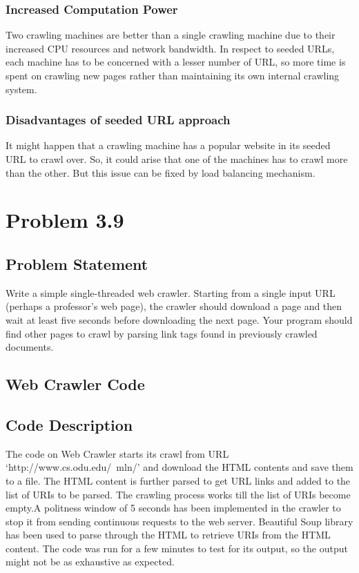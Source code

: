\documentclass[12pt]{report}
\begin{document}
\subsection{Increased Computation Power}
Two crawling machines are better than a single crawling machine due to their increased CPU resources and network bandwidth. In respect to seeded URLs, each machine has to be concerned with a lesser number of URL, so more time is spent on crawling new pages rather than maintaining its own internal crawling system.
\subsection{Disadvantages of seeded URL approach}
It might happen that a crawling machine has a popular website in its seeded URL to crawl over. So, it could arise that one of the machines has to crawl more than the other. But this issue can be fixed by load balancing mechanism. 
\chapter{Problem 3.9}
\section{Problem Statement}
Write a simple single-threaded web crawler. Starting from a single input URL (perhaps a professor’s web page), the crawler should download a page and then wait at least five seconds before downloading the next page. Your program should find other pages to crawl by parsing link tags found in previously crawled documents.
\section{Web Crawler Code}

\section{Code Description}
The code on Web Crawler starts its crawl from URL `http://www.cs.odu.edu/~mln/' and download the HTML contents and save them to a file. The HTML content is further parsed to get URL links and added to the list of URIs to be parsed. The crawling process works till the list of URIs become empty.A politness window of 5 seconds has been implemented in the crawler to stop it from sending continuous requests to the web server. Beautiful Soup library has been used to parse through the HTML to retrieve URIs from the HTML content.  \cite{11} The code was run for a few minutes to test for its output, so the output might not be as exhaustive as expected.  
\end{document}
